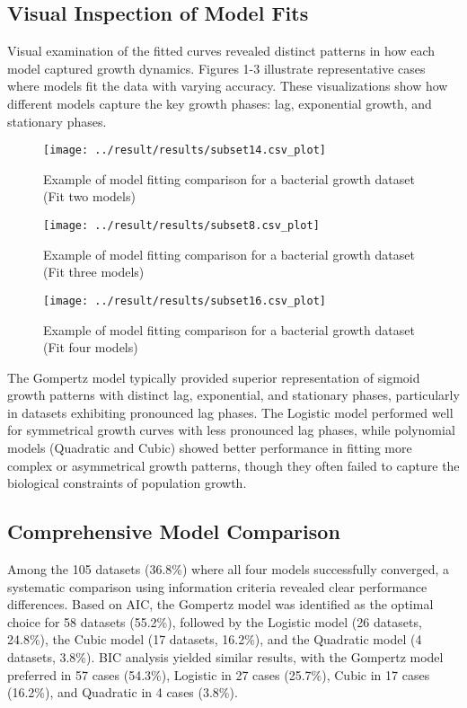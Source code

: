 \documentclass[11pt]{article}
\begin{document}
\subsection{Visual Inspection of Model Fits}
Visual examination of the fitted curves revealed distinct patterns in how each model captured growth dynamics. Figures 1-3 illustrate representative cases where models fit the data with varying accuracy. These visualizations show how different models capture the key growth phases: lag, exponential growth, and stationary phases.
\begin{figure}[H]
    \centering
    \texttt{[image: ../result/results/subset14.csv\_plot]}
    \caption{Example of model fitting comparison for a bacterial growth dataset (Fit two models)}
    \label{fig:fit_two_models}
\end{figure}
\begin{figure}[H]
    \centering
    \texttt{[image: ../result/results/subset8.csv\_plot]}
    \caption{Example of model fitting comparison for a bacterial growth dataset (Fit three models)}
    \label{fig:fit_three_models}
\end{figure}
\begin{figure}[H]
    \centering
    \texttt{[image: ../result/results/subset16.csv\_plot]}
    \caption{Example of model fitting comparison for a bacterial growth dataset (Fit four models)}
    \label{fig:fit_four_models}
\end{figure}
The Gompertz model typically provided superior representation of sigmoid growth patterns with distinct lag, exponential, and stationary phases, particularly in datasets exhibiting pronounced lag phases. The Logistic model performed well for symmetrical growth curves with less pronounced lag phases, while polynomial models (Quadratic and Cubic) showed better performance in fitting more complex or asymmetrical growth patterns, though they often failed to capture the biological constraints of population growth.

\subsection{Comprehensive Model Comparison}
Among the 105 datasets (36.8\%) where all four models successfully converged, a systematic comparison using information criteria revealed clear performance differences. Based on AIC, the Gompertz model was identified as the optimal choice for 58 datasets (55.2\%), followed by the Logistic model (26 datasets, 24.8\%), the Cubic model (17 datasets, 16.2\%), and the Quadratic model (4 datasets, 3.8\%). BIC analysis yielded similar results, with the Gompertz model preferred in 57 cases (54.3\%), Logistic in 27 cases (25.7\%), Cubic in 17 cases (16.2\%), and Quadratic in 4 cases (3.8\%).
\end{document}
